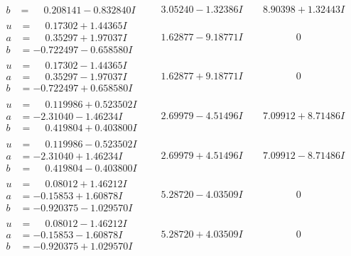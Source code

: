 \documentclass[1p]{elsarticle_modified}
\theoremstyle{definition}
\begin{document}
$$\begin{array}{c|c|c}
\begin{aligned}
b &= \phantom{-}0.208141 - 0.832840 I\end{aligned}
 & \phantom{-}3.05240 - 1.32386 I & \phantom{-}8.90398 + 1.32443 I \\ \hline\begin{aligned}
u &= \phantom{-}0.17302 + 1.44365 I \\
a &= \phantom{-}0.35297 + 1.97037 I \\
b &= -0.722497 - 0.658580 I\end{aligned}
 & \phantom{-}1.62877 - 9.18771 I & \phantom{-0.000000 } 0 \\ \hline\begin{aligned}
u &= \phantom{-}0.17302 - 1.44365 I \\
a &= \phantom{-}0.35297 - 1.97037 I \\
b &= -0.722497 + 0.658580 I\end{aligned}
 & \phantom{-}1.62877 + 9.18771 I & \phantom{-0.000000 } 0 \\ \hline\begin{aligned}
u &= \phantom{-}0.119986 + 0.523502 I \\
a &= -2.31040 - 1.46234 I \\
b &= \phantom{-}0.419804 + 0.403800 I\end{aligned}
 & \phantom{-}2.69979 - 4.51496 I & \phantom{-}7.09912 + 8.71486 I \\ \hline\begin{aligned}
u &= \phantom{-}0.119986 - 0.523502 I \\
a &= -2.31040 + 1.46234 I \\
b &= \phantom{-}0.419804 - 0.403800 I\end{aligned}
 & \phantom{-}2.69979 + 4.51496 I & \phantom{-}7.09912 - 8.71486 I \\ \hline\begin{aligned}
u &= \phantom{-}0.08012 + 1.46212 I \\
a &= -0.15853 + 1.60878 I \\
b &= -0.920375 - 1.029570 I\end{aligned}
 & \phantom{-}5.28720 - 4.03509 I & \phantom{-0.000000 } 0 \\ \hline\begin{aligned}
u &= \phantom{-}0.08012 - 1.46212 I \\
a &= -0.15853 - 1.60878 I \\
b &= -0.920375 + 1.029570 I\end{aligned}
 & \phantom{-}5.28720 + 4.03509 I & \phantom{-0.000000 } 0\\

\end{array}$$
\end{document}
